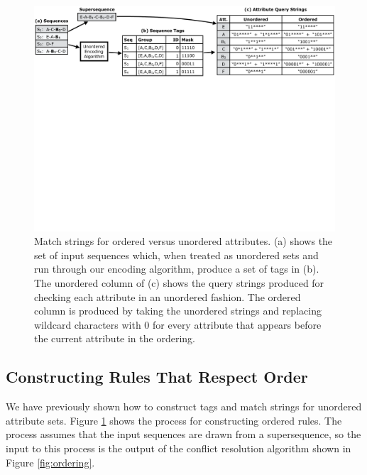 \begin{figure}[t!]
\includegraphics[trim={0 18cm 0 0}, clip, width=\textwidth]{figures/ordered_match_strings}
\caption{Match strings for ordered versus unordered attributes. (a) shows the set of input sequences which, when treated as unordered sets and run through our encoding algorithm, produce a set of tags in (b). The unordered column of (c) shows the query strings produced for checking each attribute in an unordered fashion. The ordered column is produced by taking the unordered strings and replacing wildcard characters with 0 for every attribute that appears before the current attribute in the ordering.}
\label{fig:ordered_rules}
\end{figure}


\subsection{Constructing Rules That Respect Order}
\label{s:order-rules}

We have previously shown how to construct tags and match strings for unordered attribute sets. Figure \ref{fig:ordered_rules} shows the process for constructing ordered rules. The process assumes that the input sequences are drawn from a supersequence, so the input to this process is the output of the conflict resolution algorithm shown in Figure \ref{fig:ordering}.

